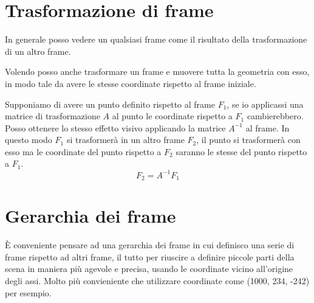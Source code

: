 \section{Trasformazione di frame}
In generale posso vedere un qualsiasi frame come il risultato della trasformazione di un altro frame.

Volendo posso anche trasformare un frame e muovere tutta la geometria con esso, in modo tale da avere le stesse coordinate
rispetto al frame iniziale.

Supponiamo di avere un punto definito rispetto al frame $F_1$, se io applicassi una matrice di trasformazione $A$ al punto
le coordinate rispetto a $F_1$ cambierebbero. Posso ottenere lo stesso effetto visivo applicando la matrice $A^{-1}$ al
frame. In questo modo $F_1$ si trasformer\`a in un altro frame $F_2$, il punto si trasformer\`a con esso ma le coordinate
del punto rispetto a $F_2$ saranno le stesse del punto rispetto a $F_1$.
\[ F_2 = A^{-1} F_1 \]

\section{Gerarchia dei frame}
\`E conveniente pensare ad una gerarchia dei frame in cui definisco una serie di frame rispetto ad altri frame, il tutto
per riuscire a definire piccole parti della scena in maniera pi\`u agevole e precisa, usando le coordinate vicino
all'origine degli assi. Molto pi\`u convieniente che utilizzare coordinate come (1000, 234, -242) per esempio.